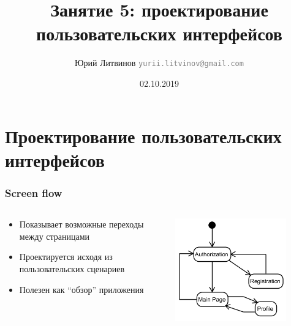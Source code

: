 \documentclass[xetex,mathserif,serif]{beamer}
\title{Занятие 5: проектирование пользовательских интерфейсов}
\author[Юрий Литвинов]{Юрий Литвинов \newline \textcolor{gray}{\small\texttt{yurii.litvinov@gmail.com}}}
\date{02.10.2019}
\begin{document}
	\frame{\titlepage}
	\section{Проектирование пользовательских интерфейсов}
	
	\begin{frame}
		\frametitle{Screen flow}
		\begin{columns}
			\begin{column}{0.6\textwidth}
				\begin{itemize}
					\item Показывает возможные переходы между страницами
					\item Проектируется исходя из пользовательских сценариев
					\item Полезен как ``обзор'' приложения
				\end{itemize}
			\end{column}
			\begin{column}{0.4\textwidth}
				\begin{center}
					\includegraphics[width=0.8\textwidth]{screenFlow.png}
				\end{center}
			\end{column}
		\end{columns}
	\end{frame}
\end{document}
